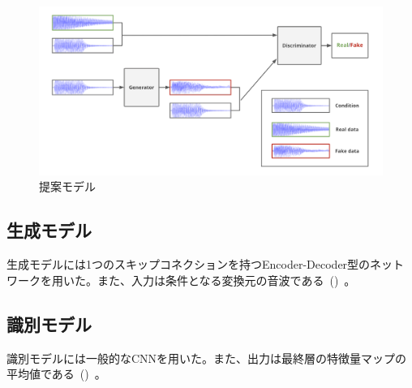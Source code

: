 \clearpage

\begin{figure}[t]
\centering
\includegraphics[width=0.8\columnwidth]{figure/pr_model.png}
\caption[本研究の提案モデル]{提案モデル}
\label{fig:pr_model}
\end{figure}

\subsection{生成モデル}

生成モデルには1つのスキップコネクションを持つEncoder-Decoder型のネットワークを用いた。また、入力は条件となる変換元の音波である~()~。

\subsection{識別モデル}

識別モデルには一般的なCNNを用いた。また、出力は最終層の特徴量マップの平均値である~()~。

